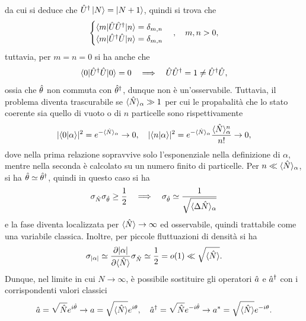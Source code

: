 da cui si deduce che $\hat{U}^\dagger\ket{N} = \ket{N + 1}$, quindi si trova che
\begin{equation}
    \begin{cases}
        \langle m | \hat{U}\hat{U}^\dagger | n \rangle = \delta_{m,n} \\
        \langle m | \hat{U}^\dagger\hat{U} | n \rangle = \delta_{m,n}
    \end{cases},\quad m,n > 0,
\end{equation}
tuttavia, per $ m = n = 0$ si ha anche che
\begin{equation}
    \langle 0 | \hat{U}^\dagger\hat{U} | 0 \rangle = 0 \quad\Longrightarrow\quad \hat{U}\hat{U}^\dagger = 1 \neq \hat{U}^\dagger\hat{U},
\end{equation}
ossia che $\hat{\theta}$ non commuta con $\hat{\theta}^\dagger$, dunque non è un'osservabile. Tuttavia, il problema diventa trascurabile se $\langle \hat{N} \rangle_\alpha \gg 1$ per cui le propabalità che lo stato coerente sia quello di vuoto o di $n$ particelle sono rispettivamente
\begin{equation}
    |\langle 0 | \alpha \rangle|^2 = e^{-\langle \hat{N} \rangle_\alpha} \to 0,\quad |\langle n | \alpha \rangle|^2 = e^{-\langle \hat{N} \rangle_\alpha}\frac{\langle \hat{N} \rangle^n_\alpha}{n!} \to 0,
\end{equation}
dove nella prima relazione sopravvive solo l'esponenziale nella definizione di $\alpha$, mentre nella seconda è calcolato su un numero finito di particelle. Per $n \ll \langle \hat{N} \rangle_\alpha$, si ha $\hat{\theta} \simeq \hat{\theta}^\dagger$, quindi in questo caso si ha
\begin{equation}
    \sigma_{\hat{N}}\sigma_{\hat{\theta}} \ge \frac{1}{2}\quad\Longrightarrow\quad \sigma_{\hat{\theta}} \simeq \frac{1}{\sqrt{\langle \Delta\hat{N} \rangle_\alpha}}
\end{equation}
e la fase diventa localizzata per $\langle \hat{N} \rangle \to \infty$ ed osservabile, quindi trattabile come una variabile classica. Inoltre, per piccole fluttuazioni di densità si ha
\begin{equation}
    \sigma_{|\alpha|} \simeq \frac{\partial|\alpha|}{\partial\langle \hat{N} \rangle}\sigma_{\hat{N}} \simeq \frac{1}{2} = o(1) \ll \sqrt{\langle \hat{N} \rangle}.
\end{equation}
Dunque, nel limite in cui $N \to \infty$, è possibile sostituire gli operatori $\hat{a}$ e $\hat{a}^\dagger$ con i corrispondenti valori classici
\begin{equation}
    \hat{a} = \sqrt{\hat{N}}e^{i\hat{\theta}} \to a = \sqrt{\langle \hat{N} \rangle}e^{i\theta},\quad \hat{a}^\dagger = \sqrt{\hat{N}}e^{-i\hat{\theta}} \to a^* = \sqrt{\langle \hat{N} \rangle}e^{-i\theta}.
\end{equation}
